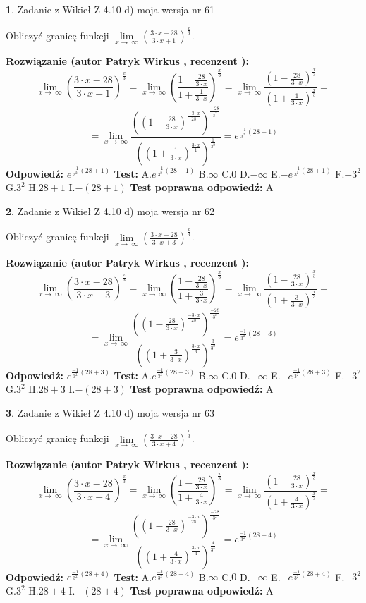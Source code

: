 \documentclass[12pt, a4paper]{article}
\theoremstyle{definition} %
\newtheorem{zad}{}
\newcommand{\zadStart}[1]{\begin{zad}#1\newline}
\newcommand{\zadStop}{\end{zad}}
\newcommand{\rozwStart}[2]{\noindent \textbf{Rozwiązanie (autor #1 , recenzent #2): }\newline}
\newcommand{\rozwStop}{\newline}
\newcommand{\odpStart}{\noindent \textbf{Odpowiedź:}\newline}
\newcommand{\odpStop}{\newline}
\newcommand{\testStart}{\noindent \textbf{Test:}\newline}
\newcommand{\testStop}{\newline}
\newcommand{\kluczStart}{\noindent \textbf{Test poprawna odpowiedź:}\newline}
\newcommand{\kluczStop}{\newline}
\begin{document}
\zadStart{Zadanie z Wikieł Z 4.10 d) moja wersja nr 61}


Obliczyć granicę funkcji  $\lim\limits_{x\to\ \infty}(\frac{3\cdot x-28}{3\cdot x+1})^{\frac{x}{3}}$.
\zadStop
\rozwStart{Patryk Wirkus}{}
$$\lim\limits_{x\to\ \infty}(\frac{3\cdot x-28}{3\cdot x+1})^{\frac{x}{3}} = \lim\limits_{x\to\ \infty}(\frac{1-\frac{28}{3\cdot x}}{1+\frac{1}{3\cdot x}})^{\frac{x}{3}}=\lim\limits_{x\to\ \infty}\frac{(1-\frac{28}{3\cdot x})^{\frac{x}{3}}}{(1+\frac{1}{3\cdot x})^{\frac{x}{3}}}=$$
$$=\lim\limits_{x\to\ \infty}\frac{((1-\frac{28}{3\cdot x})^{\frac{-3\cdot x}{28}})^{\frac{-28}{3^{2}}}}{((1+\frac{1}{3\cdot x})^{\frac{3\cdot x}{1}})^{\frac{1}{3^{2}}}}=e^{\frac{-1}{3^{2}}(28+1)}$$
\rozwStop
\odpStart
$e^{\frac{-1}{3^{2}}(28+1)}$
\odpStop
\testStart
A.$e^{\frac{-1}{3^{2}}(28+1)}$ B.$\infty$ C.$0$ D.$-\infty$ E.$-e^{\frac{-1}{3^{2}}(28+1)}$
F.$-3^{2}$ G.$3^{2}$
H.$28+1$
I.$-(28+1)$
\testStop
\kluczStart
A
\kluczStop



\zadStart{Zadanie z Wikieł Z 4.10 d) moja wersja nr 62}


Obliczyć granicę funkcji  $\lim\limits_{x\to\ \infty}(\frac{3\cdot x-28}{3\cdot x+3})^{\frac{x}{3}}$.
\zadStop
\rozwStart{Patryk Wirkus}{}
$$\lim\limits_{x\to\ \infty}(\frac{3\cdot x-28}{3\cdot x+3})^{\frac{x}{3}} = \lim\limits_{x\to\ \infty}(\frac{1-\frac{28}{3\cdot x}}{1+\frac{3}{3\cdot x}})^{\frac{x}{3}}=\lim\limits_{x\to\ \infty}\frac{(1-\frac{28}{3\cdot x})^{\frac{x}{3}}}{(1+\frac{3}{3\cdot x})^{\frac{x}{3}}}=$$
$$=\lim\limits_{x\to\ \infty}\frac{((1-\frac{28}{3\cdot x})^{\frac{-3\cdot x}{28}})^{\frac{-28}{3^{2}}}}{((1+\frac{3}{3\cdot x})^{\frac{3\cdot x}{3}})^{\frac{3}{3^{2}}}}=e^{\frac{-1}{3^{2}}(28+3)}$$
\rozwStop
\odpStart
$e^{\frac{-1}{3^{2}}(28+3)}$
\odpStop
\testStart
A.$e^{\frac{-1}{3^{2}}(28+3)}$ B.$\infty$ C.$0$ D.$-\infty$ E.$-e^{\frac{-1}{3^{2}}(28+3)}$
F.$-3^{2}$ G.$3^{2}$
H.$28+3$
I.$-(28+3)$
\testStop
\kluczStart
A
\kluczStop



\zadStart{Zadanie z Wikieł Z 4.10 d) moja wersja nr 63}


Obliczyć granicę funkcji  $\lim\limits_{x\to\ \infty}(\frac{3\cdot x-28}{3\cdot x+4})^{\frac{x}{3}}$.
\zadStop
\rozwStart{Patryk Wirkus}{}
$$\lim\limits_{x\to\ \infty}(\frac{3\cdot x-28}{3\cdot x+4})^{\frac{x}{3}} = \lim\limits_{x\to\ \infty}(\frac{1-\frac{28}{3\cdot x}}{1+\frac{4}{3\cdot x}})^{\frac{x}{3}}=\lim\limits_{x\to\ \infty}\frac{(1-\frac{28}{3\cdot x})^{\frac{x}{3}}}{(1+\frac{4}{3\cdot x})^{\frac{x}{3}}}=$$
$$=\lim\limits_{x\to\ \infty}\frac{((1-\frac{28}{3\cdot x})^{\frac{-3\cdot x}{28}})^{\frac{-28}{3^{2}}}}{((1+\frac{4}{3\cdot x})^{\frac{3\cdot x}{4}})^{\frac{4}{3^{2}}}}=e^{\frac{-1}{3^{2}}(28+4)}$$
\rozwStop
\odpStart
$e^{\frac{-1}{3^{2}}(28+4)}$
\odpStop
\testStart
A.$e^{\frac{-1}{3^{2}}(28+4)}$ B.$\infty$ C.$0$ D.$-\infty$ E.$-e^{\frac{-1}{3^{2}}(28+4)}$
F.$-3^{2}$ G.$3^{2}$
H.$28+4$
I.$-(28+4)$
\testStop
\kluczStart
A
\kluczStop
\end{document}
